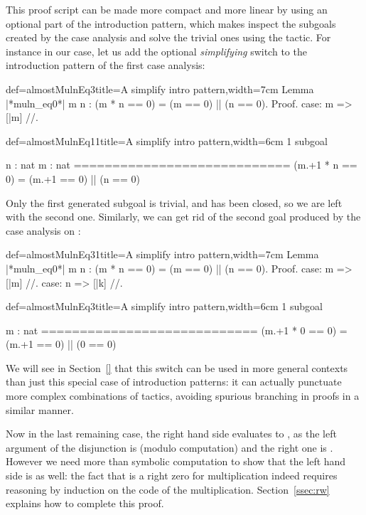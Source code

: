 This proof script can be made more compact and more linear by using an
optional part of the introduction pattern, which makes \Coq{}
inspect the subgoals created by the case analysis and solve the
trivial ones using the  tactic. For instance in our case,
let us add the optional \C{//} \emph{simplifying} switch to the
introduction pattern of the first case analysis:

\begin{coq}{def=almostMulnEq3}{title=A simplify intro pattern,width=7cm}
Lemma |*muln_eq0*| m n :
  (m * n == 0) = (m == 0) || (n == 0).
Proof.
case: m => [|m] //.
\end{coq}
\begin{coqout}{def=almostMulnEq11}{title=A simplify intro pattern,width=6cm}
1 subgoal

n : nat
m : nat
============================
(m.+1 * n == 0) =
(m.+1 == 0) || (n == 0)
\end{coqout}

Only the first generated subgoal is trivial, and has been closed, so
we are left with the second one. Similarly, we can get rid of the
second goal produced by the case analysis on :

\begin{coq}{def=almostMulnEq31}{title=A simplify intro pattern,width=7cm}
Lemma |*muln_eq0*| m n :
  (m * n == 0) = (m == 0) || (n == 0).
Proof.
case: m => [|m] //.
case: n => [|k] //.
\end{coq}
\begin{coqout}{def=almostMulnEq3}{title=A simplify intro pattern,width=6cm}
1 subgoal

m : nat
============================
(m.+1 * 0 == 0) =
(m.+1 == 0) || (0 == 0)
\end{coqout}

We will see in Section~\ref{} that this \C{//} switch can be used in
more general contexts than just this special case of introduction patterns:
it can actually punctuate more complex combinations of tactics,
avoiding spurious branching in proofs in a similar manner.

Now in the last remaining case, the right hand side evaluates to
, as the left argument of the disjunction is  (modulo
computation) and the right one is . However we need
more than symbolic computation to show that the left hand side is
 as well: the fact that  is a right zero for
multiplication indeed requires reasoning by induction on the code of the
multiplication. Section~\ref{ssec:rw} explains how to complete this
proof.


